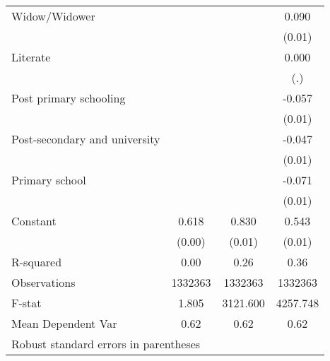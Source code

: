 {\begin{tabular}{l*{3}{c}}
Widow/Widower       &                     &                     &       0.090\sym{***}\\
                    &                     &                     &      (0.01)         \\
Literate            &                     &                     &       0.000         \\
                    &                     &                     &         (.)         \\
Post primary schooling&                     &                     &      -0.057\sym{***}\\
                    &                     &                     &      (0.01)         \\
Post-secondary and university&                     &                     &      -0.047\sym{***}\\
                    &                     &                     &      (0.01)         \\
Primary school      &                     &                     &      -0.071\sym{***}\\
                    &                     &                     &      (0.01)         \\
Constant            &       0.618\sym{***}&       0.830\sym{***}&       0.543\sym{***}\\
                    &      (0.00)         &      (0.01)         &      (0.01)         \\
\hline
R-squared           &        0.00         &        0.26         &        0.36         \\
Observations        &     1332363         &     1332363         &     1332363         \\
F-stat              &       1.805         &    3121.600         &    4257.748         \\
Mean Dependent Var  &        0.62         &        0.62         &        0.62         \\
\hline\hline
\multicolumn{4}{l}{\footnotesize Robust standard errors in parentheses}\\
\end{tabular}
}
